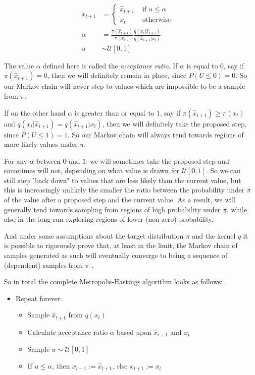 \begin{align*}
x_{t+1} & = \begin{cases}
    \hat{x}_{t+1} & \text{ if } u \le \alpha \\
            x_{t} & \text{ otherwise }
            \end{cases} \\
\alpha & = \frac{\pi(\hat{x}_{t+1})}{\pi(x_t)} \frac{q(x_t | \hat{x}_{t+1})}{q(\hat{x}_{t+1} | x_t)} \\
u & \sim \mathcal{U}[0,1]
\end{align*}

The value $\alpha$ defined here is called the \textit{acceptance ratio}. If $\alpha$ is equal to $0$, say if $\pi(\hat{x}_{t+1}) = 0$, then we will definitely remain in place, since $P(U \le 0) = 0$. So our Markov chain will never step to values which are impossible to be a sample from $\pi$.

If on the other hand $\alpha$ is greater than or equal to $1$, say if $\pi(\hat{x}_{t+1}) \ge {\pi(x_t)}$ and $q(x_t | \hat{x}_{t+1}) = q(\hat{x}_{t+1} | x_t)$, then we will definitely take the proposed step, since $P(U \le 1) = 1$. So our Markov chain will always tend towards regions of more likely values under $\pi$.

For any $\alpha$ between $0$ and $1$, we will sometimes take the proposed step and sometimes will not, depending on what value is drawn for $\mathcal{U}[0,1]$. So we can still step "back down" to values that are less likely than the current value, but this is increasingly unlikely the smaller the ratio between the probability under $\pi$ of the value after a proposed step and the current value. As a result, we will generally tend towards sampling from regions of high probability under $\pi$, while also in the long run exploring regions of lower (non-zero) probability.

And under some assumptions about the target distribution $\pi$ and the kernel $q$ it is possible to rigorously prove that, at least in the limit, the Markov chain of samples generated as such will eventually converge to being a sequence of (dependent) samples from $\pi$ \cite{metropolis1953equation}.

So in total the complete Metropolis-Hastings algorithm looks as follows:

\begin{minipage}{\linewidth}
\begin{itemize}
\item Repeat forever:
  \begin{itemize}
  \item Sample $\hat{x}_{t+1}$ from $q(x_t)$
  \item Calculate acceptance ratio $\alpha$ based upon $\hat{x}_{t+1}$ and $x_t$
  \item Sample $u \sim \mathcal{U}[0,1]$
  \item If $u \le \alpha$, then $x_{t+1} := \hat{x}_{t+1}$, else $x_{t+1} := x_t$
  \end{itemize}
\end{itemize}
\end{minipage}

